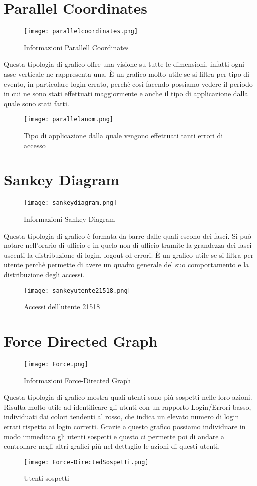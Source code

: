 \section{Parallel Coordinates}
\begin{figure}[H]
	\centering
	\texttt{[image: parallelcoordinates.png]}
	\caption{Informazioni Parallell Coordinates}
  \end{figure}
Questa tipologia di grafico offre una visione su tutte le dimensioni, infatti ogni asse verticale ne rappresenta una. È un grafico molto utile se si filtra per tipo di evento, in particolare login errato, perchè così facendo possiamo vedere il periodo in cui ne sono stati effettuati maggiormente e anche il tipo di applicazione dalla quale sono stati fatti.
\begin{figure}[H]
	\centering
	\texttt{[image: parallelanom.png]}
	\caption{Tipo di applicazione dalla quale vengono effettuati tanti errori di accesso}
\end{figure}

\section{Sankey Diagram}
\begin{figure}[H]
	\centering
	\texttt{[image: sankeydiagram.png]}
	\caption{Informazioni Sankey Diagram}
  \end{figure}
Questa tipologia di grafico è formata da barre dalle quali escono dei fasci. Si può notare nell'orario di ufficio e in quelo non di ufficio tramite la grandezza dei fasci uscenti la distribuzione di login, logout ed errori. È un grafico utile se si filtra per utente perchè permette di avere un quadro generale del suo comportamento e la distribuzione degli accessi.
\begin{figure}[H]
	\centering
	\texttt{[image: sankeyutente21518.png]}
	\caption{Accessi dell'utente 21518}
\end{figure}

\section{Force Directed Graph}
\begin{figure}[H]
	\centering
	\texttt{[image: Force.png]}
	\caption{Informazioni Force-Directed Graph}
  \end{figure}
Questa tipologia di grafico mostra quali utenti sono più sospetti nelle loro azioni. Risulta molto utile ad identificare gli utenti con un rapporto Login/Errori basso, individuati dai colori tendenti al rosso, che indica un elevato numero di login errati rispetto ai login corretti. Grazie a questo grafico possiamo individuare in modo immediato gli utenti sospetti e questo ci permette poi di andare a controllare negli altri grafici più nel dettaglio le azioni di questi utenti.

\begin{figure}[H]
	\centering
	\texttt{[image: Force-DirectedSospetti.png]}
	\caption{Utenti sospetti}
\end{figure}
